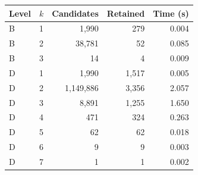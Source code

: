 \begin{tabular}{@{}llrrr@{}}
\toprule
Level & $k$ & Candidates & Retained & Time (s)\\
\midrule
B & 1 & 1,990 & 279 & 0.004 \\
B & 2 & 38,781 & 52 & 0.085 \\
B & 3 & 14 & 4 & 0.009 \\
D & 1 & 1,990 & 1,517 & 0.005 \\
D & 2 & 1,149,886 & 3,356 & 2.057 \\
D & 3 & 8,891 & 1,255 & 1.650 \\
D & 4 & 471 & 324 & 0.263 \\
D & 5 & 62 & 62 & 0.018 \\
D & 6 & 9 & 9 & 0.003 \\
D & 7 & 1 & 1 & 0.002 \\
\bottomrule
\end{tabular}
